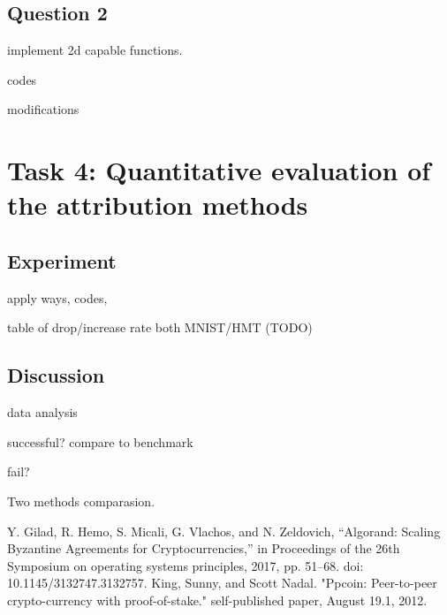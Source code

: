 \documentclass[conference]{IEEEtran}
\begin{document}
\subsection{Question 2}

implement 2d capable functions.

codes

modifications

\section{Task 4: Quantitative evaluation of the attribution methods}

\subsection {Experiment}

apply ways, codes,

table of drop/increase rate both MNIST/HMT (TODO)

\subsection{Discussion}

data analysis

successful? compare to benchmark

fail?

Two methods comparasion.

\begin{thebibliography}{00}
Y. Gilad, R. Hemo, S. Micali, G. Vlachos, and N. Zeldovich, “Algorand: Scaling Byzantine Agreements for Cryptocurrencies,” in Proceedings of the 26th Symposium on operating systems principles, 2017, pp. 51–68. doi: 10.1145/3132747.3132757.
 King, Sunny, and Scott Nadal. "Ppcoin: Peer-to-peer crypto-currency with proof-of-stake." self-published paper, August 19.1, 2012.

\end{thebibliography}
\end{document}
